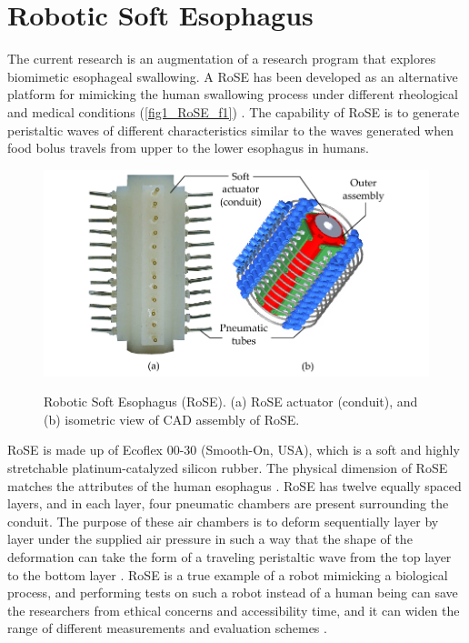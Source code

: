 \section{Robotic Soft Esophagus}

The current research is an augmentation of a research program that
explores biomimetic esophageal swallowing. A \ac{RoSE} has been developed as an alternative platform for mimicking
the human swallowing process under different rheological and
medical conditions (\autoref{fig1_RoSE_f1}) \cite{Dirven2014}. The capability of \ac{RoSE} is to generate
peristaltic waves of different characteristics similar to the waves
generated when food bolus travels from upper to the lower esophagus
in humans.

\begin{figure}[bth]
	\myfloatalign
	{\includegraphics[width=\linewidth]{images/Ch1/fig1_RoSE_f1}} \quad
	\caption[Robotic Soft Esophagus (RoSE)]{Robotic Soft Esophagus (RoSE). (a) RoSE actuator (conduit), and (b) isometric view of \ac{CAD} assembly of RoSE.}\label{fig1_RoSE_f1}
\end{figure}

\ac{RoSE} is made up of Ecoflex 00-30 (Smooth-On, USA), which is a soft
and highly stretchable platinum-catalyzed silicon rubber. The physical
dimension of \ac{RoSE} matches the attributes of the human esophagus
\cite{Dirven2014}. \ac{RoSE} has twelve equally spaced layers, and in each layer, four
pneumatic chambers are present surrounding the conduit. The purpose
of these air chambers is to deform sequentially layer by layer
under the supplied air pressure in such a way that the shape of the
deformation can take the form of a traveling peristaltic wave from
the top layer to the bottom layer \cite{Dirven2015}. \ac{RoSE} is a true example of a
robot mimicking a biological process, and performing tests on such a
robot instead of a human being can save the researchers from ethical
concerns and accessibility time, and it can widen the range of different
measurements and evaluation schemes \cite{Dirven2015}.


